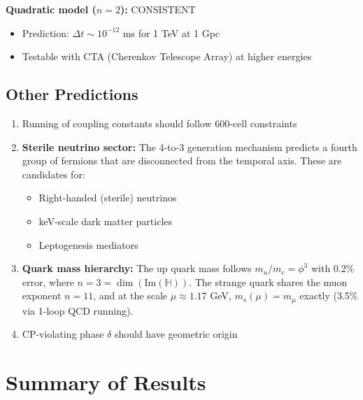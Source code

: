 \documentclass[12pt,a4paper]{article}
\begin{document}
\textbf{Quadratic model ($n=2$):} CONSISTENT
\begin{itemize}
    \item Prediction: $\Delta t \sim 10^{-12}$ ms for 1 TeV at 1 Gpc
    \item Testable with CTA (Cherenkov Telescope Array) at higher energies
\end{itemize}

\subsection{Other Predictions}

\begin{enumerate}
    \item Running of coupling constants should follow 600-cell constraints
    \item \textbf{Sterile neutrino sector:} The 4-to-3 generation mechanism predicts a fourth group of fermions that are disconnected from the temporal axis. These are candidates for:
    \begin{itemize}
        \item Right-handed (sterile) neutrinos
        \item keV-scale dark matter particles
        \item Leptogenesis mediators
    \end{itemize}
    \item \textbf{Quark mass hierarchy:} The up quark mass follows $m_u/m_e = \phi^3$ with 0.2\% error, where $n=3 = \dim(\text{Im}(\mathbb{H}))$. The strange quark shares the muon exponent $n=11$, and at the scale $\mu \approx 1.17$ GeV, $m_s(\mu) = m_\mu$ exactly (3.5\% via 1-loop QCD running).
    \item CP-violating phase $\delta$ should have geometric origin
\end{enumerate}

\section{Summary of Results}
\end{document}
